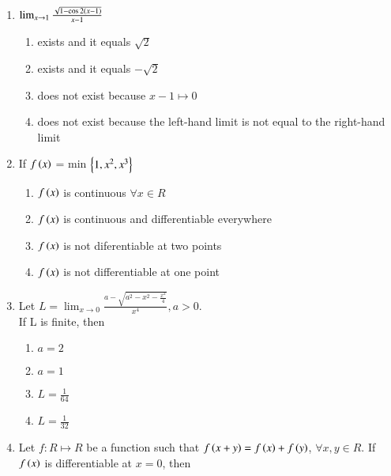 \documentclass[journal]{IEEEtran}
\numberwithin{equation}{enumi}
\numberwithin{figure}{enumi}
\begin{document}
\begin{enumerate}
    \item 
    $\lim_{x \to1}\frac{\sqrt{1-\cos 2\left(x-1\right)}}{x-1}$ 

    \hfill{}
    
    \begin{enumerate}
        \item exists and it equals $\sqrt{2}$
        \item exists and it equals $-\sqrt{2}$
        \item does not exist because $x-1\mapsto 0$
        \item does not exist because the left-hand limit is not equal to the right-hand limit
    \end{enumerate}


    \item 
    If $f\left(x\right)$ = min $\left\{1,x^2,x^3\right\}$ 

    \hfill{}
    

    \begin{enumerate}
        
        \item $f\left(x\right)$ is continuous $\forall x \in R$
        \item $f\left(x\right)$ is continuous and differentiable everywhere
        \item $f\left(x\right)$ is not diferentiable at two points
        \item $f\left(x\right)$ is not differentiable at one point
    \end{enumerate}


    \item 
    Let $L=\lim_{x \to0}\frac{a-\sqrt{a^2-x^2-\frac{x^2}{4}}}{x^4}, a>0$.\\ If L is finite, then 

    \hfill{}
    
    \begin{multicols}{4}
    \begin{enumerate}
        \item $a=2$ 
        \item $a=1$
        \item $L=\frac{1}{64}$
        \item $L=\frac{1}{32}$
    \end{enumerate}
    \end{multicols}	    


    \item 
    Let $f:R \mapsto R$ be a function such that $f\left(x+y\right)=f\left(x\right)+f\left(y\right)$, $\forall x,y\in R$. If $f\left(x\right)$ is differentiable at $x=0$, then 


\end{enumerate}
\end{document}
